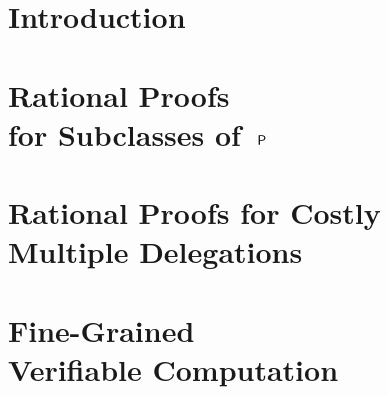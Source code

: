 \documentclass[justified,nobib]{tufte-book}
\begin{document}
\setcounter{page}{1}
	


% 


\pagestyle{fancy}

\chapter{Introduction}


%

\chapter[Rational Proofs for Subclasses of $\P$]{Rational Proofs\\for Subclasses of $\ \P$}
\label{chap:RP-expr}


\chapter[Rational Proofs for Costly Multiple Delegations]{Rational Proofs for Costly\\Multiple Delegations}
\label{chap:RP-seq}


\chapter[Fine-Grained Verifiable Computation]{Fine-Grained\\Verifiable Computation}
\label{chap:FG}


%
%



\printbibliography
\end{document}
